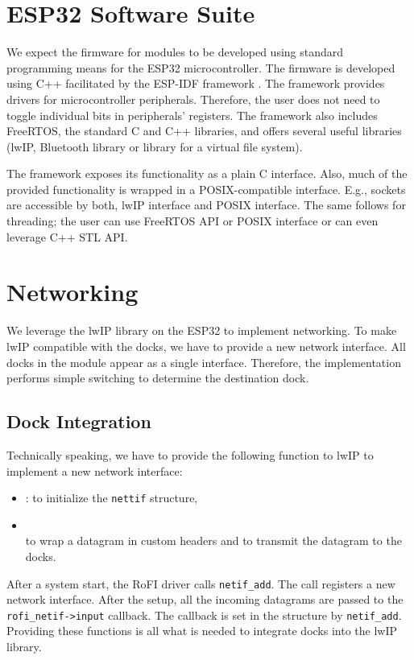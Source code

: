 \section{ESP32 Software Suite} \label{sec:hardware}

We expect the firmware for modules to be developed using standard programming
means for the ESP32 microcontroller. The firmware is developed using C++
facilitated by the ESP-IDF framework \cite{noauthor_esp-idf_nodate}. The
framework provides drivers for microcontroller peripherals. Therefore, the user
does not need to toggle individual bits in peripherals' registers. The framework
also includes FreeRTOS, the standard C and C++ libraries, and offers several
useful libraries (lwIP, Bluetooth library or library for a virtual file
system).

The framework exposes its functionality as a plain C interface. Also, much of
the provided functionality is wrapped in a POSIX-compatible interface. E.g.,
sockets are accessible by both, lwIP interface and POSIX interface. The same
follows for threading; the user can use FreeRTOS API or POSIX interface or can
even leverage C++ STL API.

\section{Networking} \label{sec:networking}

We leverage the lwIP library on the ESP32 to implement networking. To make lwIP
compatible with the docks, we have to provide a new network interface.
All docks in the module appear as a single interface. Therefore, the
implementation performs simple switching to determine the destination dock.

\subsection{Dock Integration}

Technically speaking, we have to provide the following function to lwIP to
implement a new network interface:
\begingroup
\setlength{\rightskip}{0pt plus 1 fil}
\begin{itemize}
    \item {}:
    to initialize the \texttt{nettif} structure,
    \item {} \\ 
    to wrap a datagram in custom headers and to transmit the datagram to the
    docks.
\end{itemize}
\endgroup
After a system start, the RoFI driver calls \texttt{netif\_add}. The call
registers a new network interface. After the setup, all the incoming datagrams
are passed to the \texttt{rofi\_netif->input} callback. The callback is set in
the structure by \texttt{netif\_add}. Providing these functions is all what is
needed to integrate docks into the lwIP library.

